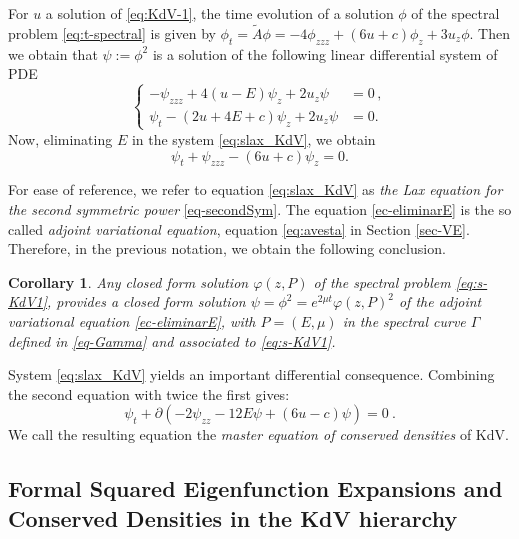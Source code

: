 \documentclass[a4paper,12pt]{article}
\newtheorem{cor}[thm]{Corollary}
\begin{document}
\bigskip

For $u$ a  solution of \eqref{eq:KdV-1},   the time evolution of a solution  $\phi$ of the spectral problem \eqref{eq:t-spectral} is given by $ \phi_t=\widetilde{A}\phi =-4\phi_{zzz}+(6u+c)\phi_z+3u_z \phi$. Then we obtain that $\psi := \phi^2$ is a solution of the following linear differential system of PDE
\begin{equation}\label{eq:slax_KdV}
\left\{
\begin{array}{rr}
-\psi_{zzz}+4 (u-E)\psi_z +2u_z \psi  &=0 \, ,\\   
\psi_t-(2u+4E+c)\psi_z + 2u_z\psi &=0.
\end{array}
\right.
\end{equation}
Now, eliminating $E$ in the system  \eqref{eq:slax_KdV}, we obtain 
{\begin{equation}\label{ec-eliminarE}
\psi_t + \psi_{zzz} - (6u+c  )\psi_z =0 .    
\end{equation}
}


For ease of reference, we refer to equation \eqref{eq:slax_KdV} as {\it the Lax equation for the second symmetric power} \eqref{eq-secondSym}. The equation \eqref{ec-eliminarE} is the so called {\it adjoint variational equation},  equation  \eqref{eq:avesta} in Section \ref{sec-VE}. 
Therefore, in the previous notation, we obtain the following conclusion.

\begin{cor}\label{cor-sol-second-symm}
  Any closed form solution  $\varphi (z, P )$ of the spectral problem \eqref{eq:s-KdV1}, provides a closed form solution $ \psi = \phi^2 = e^{2\mu t} \varphi (z, P)^2 $ of the adjoint variational equation \eqref{ec-eliminarE}, with $P=(E, \mu )$ in the spectral curve $\Gamma$ defined in \eqref{eq-Gamma} and associated to \eqref{eq:s-KdV1}.
\end{cor}

System \eqref{eq:slax_KdV} yields an important differential consequence. Combining the second equation with twice the first gives: 
{
\begin{equation}\label{eq-generating-densities}
  \psi_t + \partial (-2\psi_{zz}-12E \psi +(6u -c)\psi)=0 \ .  
\end{equation}
}
We  call the resulting equation  the  {\it master equation of conserved densities} of  KdV.


\subsection{Formal Squared Eigenfunction Expansions and Conserved Densities in the KdV hierarchy}
\end{document}
